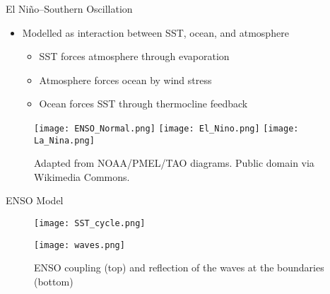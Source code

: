 \documentclass[9pt,xcolor=dvipsnames]{beamer}
\begin{document}
\begin{frame}{El Niño--Southern Oscillation}

\begin{itemize}

    \item Modelled as interaction between SST, ocean, and atmosphere
    \begin{itemize}
        \item SST forces atmosphere through evaporation
        \item Atmosphere forces ocean by wind stress
        \item Ocean forces SST through thermocline feedback
    \end{itemize}
\end{itemize}

\begin{figure}
        \centering
        \texttt{[image: ENSO\_Normal.png]} \hspace{1pt}
        \texttt{[image: El\_Nino.png]} \hspace{1pt}
        \texttt{[image: La\_Nina.png]}
        \caption*{Adapted from NOAA/PMEL/TAO diagrams. Public domain via Wikimedia Commons.}
\end{figure}
    
\end{frame}

\begin{frame}{ENSO Model}
\begin{figure}
    \texttt{[image: SST\_cycle.png]}
\end{figure}
\begin{figure}
    \texttt{[image: waves.png]}
    \caption*{ENSO coupling (top) and reflection of the waves at the boundaries (bottom)}
\end{figure}
\end{frame}
\end{document}
